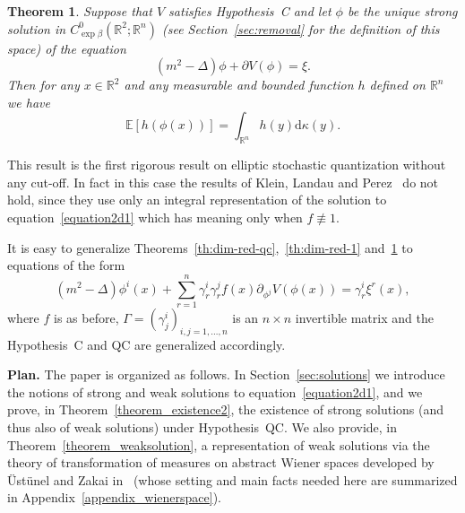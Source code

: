 \documentclass[a4paper,10pt]{article}
\newcommand{\mathd}{\mathrm{d}}
\newcommand{\tmtextbf}[1]{{\bfseries{#1}}}
\newcommand{\nequiv}[0]{\not\equiv}
\newtheorem{theorem}{Theorem}
\begin{document}
\begin{theorem}
  \label{theorem_cutoff1}Suppose that $V$ satisfies Hypothesis~C and let
  $\phi$ be the unique strong solution in $C^0_{\exp \beta} (\mathbb{R}^2 ;
  \mathbb{R}^n)$ (see Section~\ref{sec:removal} for the definition of this
  space) of the equation
  \begin{equation}
    (m^2 - \Delta) \phi + \partial V (\phi) = \xi . \label{equationcutoff1}
  \end{equation}
  Then for any $x \in \mathbb{R}^2$ and any measurable and bounded function
  $h$ defined on $\mathbb{R}^n$ we have
  \begin{equation}
    \mathbb{E} [h (\phi (x))] = \int_{\mathbb{R}^n} h (y) \mathd \kappa (y) .
    \label{equationcutoff3}
  \end{equation}
\end{theorem}

This result is the first rigorous result on elliptic stochastic quantization
without any cut-off. In fact in this case the results of Klein, Landau and
Perez~{\cite{Klein1984}} do not hold, since they use only an integral
representation of the solution to equation~{\eqref{equation2d1}} which has
meaning only when $f \nequiv 1$.

\begin{remark}
  It is easy to generalize Theorems~\ref{th:dim-red-qc},~\ref{th:dim-red-1}
  and~\ref{theorem_cutoff1} to equations of the form
  \begin{equation}
    (m^2 - \Delta) \phi^i (x) + \sum_{r = 1}^n \gamma_r^i \gamma^j_r f (x)
    \partial_{\phi^j} V (\phi (x)) = \gamma^i_r \xi^r (x),
    \label{equation2d1-gamma}
  \end{equation}
  where $f$ is as before, $\Gamma = (\gamma^i_j)_{i, j = 1, \ldots, n}$ is an
  $n \times n$ invertible matrix and the Hypothesis~C and QC are generalized
  accordingly.
\end{remark}

\tmtextbf{Plan.} The paper is organized as follows. In
Section~\ref{sec:solutions} we introduce the notions of strong and weak
solutions to equation~{\eqref{equation2d1}}, and we prove, in
Theorem~\ref{theorem_existence2}, the existence of strong
solutions (and thus also of weak solutions) under Hypothesis~QC. We also provide, in
Theorem~\ref{theorem_weaksolution}, a representation of weak solutions via the
theory of transformation of measures on abstract Wiener spaces developed by
{\"U}st{\"u}nel and Zakai in~{\cite{Ustunel2000}} (whose setting and main
facts needed here are summarized in Appendix~\ref{appendix_wienerspace}).
\end{document}
